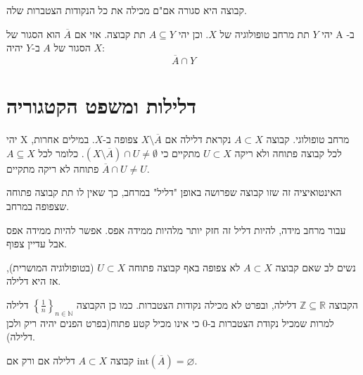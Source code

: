 \documentclass{tstextbook}
\begin{document}
\begin{corollary}
קבוצה היא סגורה אם"ם מכילה את כל הנקודות הצטברות שלה.

\end{corollary}
\begin{proposition}
יהי \(Y\) תת מרחב טופולוגיה של \(X\). וכן יהי \(A\subseteq Y\) תת קבוצה. אזי אם \(\overline{A}\) הוא הסגור של A ב-\(X\) הסגור של \(A\) ב-\(Y\) יהיה:
$$\overline{A} \cap  Y$$

\end{proposition}
\section{דלילות ומשפט הקטגוריה}

\begin{definition}
יהי X מרחב טופולוגי. קבוצה \(A\subset X\) נקראת דלילה אם \(X\setminus\overline{A}\) צפופה ב-\(X\).
במילים אחרות, לכל קבוצה פתוחה ולא ריקה \(U\subset X\) מתקיים כי \(\left( X\setminus\overline{A} \right)\cap U\ne\emptyset\). כלומר לכל \(A\subseteq X\) פתוחה לא ריקה מתקיים \(\overline{A}\cap U\neq U\).

\end{definition}
\begin{remark}
האינטואיציה זה שזו קבוצה שפרושה באופן "דליל" במרחב, כך שאין לו תת קבוצה פתוחה שצפופה במרחב.

\end{remark}
\begin{remark}
עבור מרחב מידה, להיות דליל זה חזק יותר מלהיות ממידה אפס. אפשר להיות ממידה אפס אבל עדיין צפוף.

\end{remark}
\begin{remark}
נשים לב שאם קבוצה \(A\subset X\) לא צפופה באף קבוצה פתוחה \(U\subset X\) (בטופולוגיה המושרית), אז היא דלילה.

\end{remark}
\begin{example}
הקבוצה \(\mathbb{Z}\subseteq \mathbb{R}\) דלילה, ובפרט לא מכילה נקודות הצטברות. כמו כן הקבוצה \(\left\{  \frac{1}{n}  \right\}_{n \in \mathbb{N}}\) דלילה למרות שמכיל נקודת הצטברות ב-\(0\) כי אינו מכיל קטע פתוח(בפרט הפנים יהיה ריק ולכן דלילה).

\end{example}
\begin{proposition}
קבוצה \(A\subset X\) דלילה אם ורק אם \(\text{int}\left( \overline{A} \right)=\varnothing\).

\end{proposition}
\end{document}
